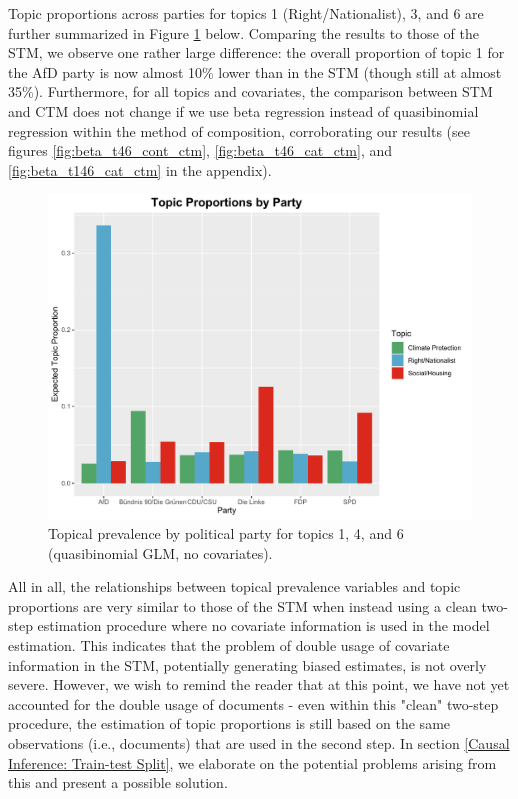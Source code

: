 Topic proportions across parties for topics 1 (Right/Nationalist), 3, and 6 are further summarized in Figure \ref{fig:quasi_t146_cat_ctm} below. Comparing the results to those of the STM, we observe one rather large difference: the overall proportion of topic 1 for the AfD party is now almost 10\% lower than in the STM (though still at almost 35\%). Furthermore, for all topics and covariates, the comparison between STM and CTM does not change if we use beta regression instead of quasibinomial regression within the method of composition, corroborating our results (see figures \ref{fig:beta_t46_cont_ctm}, \ref{fig:beta_t46_cat_ctm}, and \ref{fig:beta_t146_cat_ctm} in the appendix).

\begin{figure}[h!]
  \centering
  \captionsetup{justification=centering,margin=2cm}
  \includegraphics[scale=0.5]{../plots/6_1/quasi_t146_cat_ctm.pdf}
  \caption{Topical prevalence by political party for topics 1, 4, and 6 (quasibinomial GLM, no covariates).}
  \label{fig:quasi_t146_cat_ctm}
\end{figure}

All in all, the relationships between topical prevalence variables and topic proportions are very similar to those of the STM when instead using a clean two-step estimation procedure where no covariate information is used in the model estimation. This indicates that the problem of double usage of covariate information in the STM, potentially generating biased estimates, is not overly severe. However, we wish to remind the reader that at this point, we have not yet accounted for the double usage of documents - even within this "clean" two-step procedure, the estimation of topic proportions is still based on the same observations (i.e., documents) that are used in the second step. In section \ref{Causal Inference: Train-test Split}, we elaborate on the potential problems arising from this and present a possible solution.